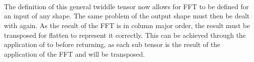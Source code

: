 \begin{AgdaAlign}
\begin{code}
\AgdaSymbol{(}\AgdaSpace{}%
\AgdaSymbol{(}\AgdaSpace{}%
\AgdaSpace{}%
\AgdaSymbol{))}\AgdaSpace{}%
\AgdaSymbol{(}\AgdaSpace{}%
\AgdaSymbol{)}\<%
\end{code}
\begin{code}[hide]%
\>[2][@{}l@{\AgdaIndent{1}}]%
\>[6]\<%
\\
\>[6][@{}l@{\AgdaIndent{0}}]%
\>[8]\<%
\\
\>[8][@{}l@{\AgdaIndent{0}}]%
\>[10]\<%
\\
\>[10][@{}l@{\AgdaIndent{0}}]%
\>[12]\AgdaSymbol{\AgdaUnderscore{}}\AgdaSpace{}%
\AgdaSymbol{:}\AgdaSpace{}%
\AgdaSpace{}%
\AgdaSymbol{(}\AgdaSpace{}%
\AgdaSpace{}%
\AgdaSpace{}%
\AgdaSpace{}%
\AgdaSymbol{)}\<%
\end{code}
\end{AgdaAlign}

The definition of this general twiddle tensor now allows for FFT to be defined
for an input of any shape.
The same problem of the output shape must then be dealt with again.
As the result of the FFT is in column major order, the result must be transposed
for flatten to represent it correctly.
This can be achieved through the application of  to 
before returning, as each sub tensor is the result of the application of the FFT and
will be transposed.

